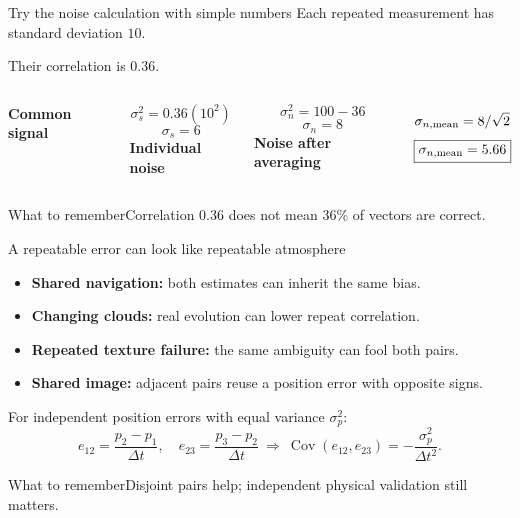 \documentclass[aspectratio=169,11pt]{beamer}
\newcommand{\prov}{}
\newcommand{\evidence}[1]{\gdef\prov{#1}}
\newcommand{\takeaway}[1]{\vspace{0.3em}\begin{block}{What to remember}#1\end{block}}
\newcommand{\Cov}{\operatorname{Cov}}
\begin{document}
\evidence{Original synthetic covariance example; numbers are not taken from the Jupiter analysis.}
\begin{frame}{Try the noise calculation with simple numbers}
 Each repeated measurement has standard deviation $10$.\par\medskip
 Their correlation is $0.36$.
 \vspace{0.4cm}
 \begin{columns}[T]
 \textbf{Common signal}\par
 \[\sigma_s^2=0.36(10^2)\]
 \[\boxed{\sigma_s=6}\]
 \textbf{Individual noise}\par
 \[\sigma_n^2=100-36\]
 \[\boxed{\sigma_n=8}\]
 \textbf{Noise after averaging}\par
 \[\sigma_{n,\rm mean}=8/\sqrt2\]
 \[\boxed{\sigma_{n,\rm mean}=5.66}\]
 \end{columns}
 \takeaway{Correlation 0.36 does not mean 36\% of vectors are correct.}
\end{frame}

\evidence{Original assessment of assumptions and shared-image covariance.}
\begin{frame}{A repeatable error can look like repeatable atmosphere}
 \begin{itemize}
 \item \textbf{Shared navigation:} both estimates can inherit the same bias.
 \item \textbf{Changing clouds:} real evolution can lower repeat correlation.
 \item \textbf{Repeated texture failure:} the same ambiguity can fool both pairs.
 \item \textbf{Shared image:} adjacent pairs reuse a position error with opposite signs.
 \end{itemize}
 \small For independent position errors with equal variance $\sigma_p^2$:
 \[
 e_{12}=\frac{p_2-p_1}{\Delta t},\quad
 e_{23}=\frac{p_3-p_2}{\Delta t}
 \ \Rightarrow\ {}
 \Cov(e_{12},e_{23})=-\frac{\sigma_p^2}{\Delta t^2}.
 \]
 \takeaway{Disjoint pairs help; independent physical validation still matters.}
\end{frame}
\end{document}
